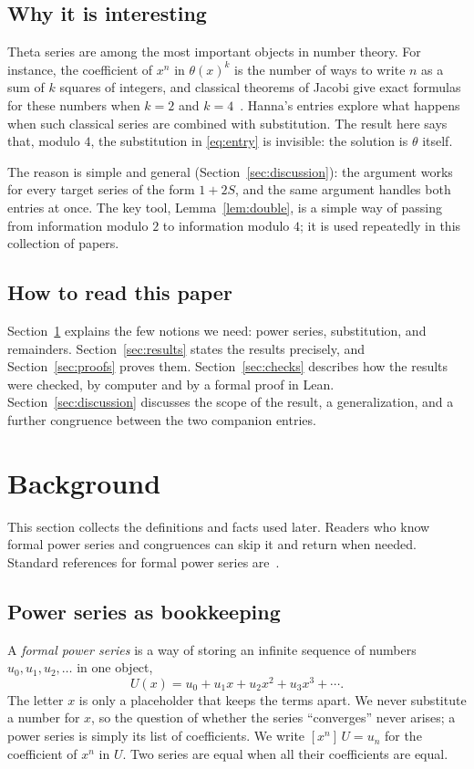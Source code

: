 \documentclass[11pt,a4paper]{article}
\theoremstyle{definition}
\theoremstyle{remark}
\newcommand{\coeff}[2]{[x^{#1}]\,#2}
\begin{document}
\subsection{Why it is interesting}
Theta series are among the most important objects in number theory. For instance, the coefficient of $x^n$ in
$\theta(x)^k$ is the number of ways to write $n$ as a sum of $k$ squares of integers, and classical theorems of Jacobi
give exact formulas for these numbers when $k=2$ and $k=4$~\cite{hardywright}. Hanna's entries explore what happens when
such classical series are combined with substitution. The result here says that, modulo $4$, the substitution in
\eqref{eq:entry} is invisible: the solution is $\theta$ itself.

The reason is simple and general (Section~\ref{sec:discussion}): the argument works for every target series of the form
$1+2S$, and the same argument handles both entries at once. The key tool, Lemma~\ref{lem:double}, is a simple way of
passing from information modulo $2$ to information modulo $4$; it is used repeatedly in this collection of papers.

\subsection{How to read this paper}
Section~\ref{sec:background} explains the few notions we need: power series, substitution, and remainders.
Section~\ref{sec:results} states the results precisely, and Section~\ref{sec:proofs} proves them.
Section~\ref{sec:checks} describes how the results were checked, by computer and by a formal proof in Lean.
Section~\ref{sec:discussion} discusses the scope of the result, a generalization, and a further congruence between the
two companion entries.
\section{Background}\label{sec:background}
This section collects the definitions and facts used later. Readers who know formal power series and congruences can skip it and return when needed. Standard references for formal power series are~\cite{niven,stanley}.
\subsection{Power series as bookkeeping}
A \emph{formal power series} is a way of storing an infinite sequence of numbers $u_0,u_1,u_2,\dots$ in one object,
\[
U(x)=u_0+u_1x+u_2x^2+u_3x^3+\cdots .
\]
The letter $x$ is only a placeholder that keeps the terms apart. We never substitute a number for $x$, so the question
of whether the series ``converges'' never arises; a power series is simply its list of coefficients. We write
$\coeff{n}{U}=u_n$ for the coefficient of $x^n$ in $U$. Two series are equal when all their coefficients are equal.
\end{document}
